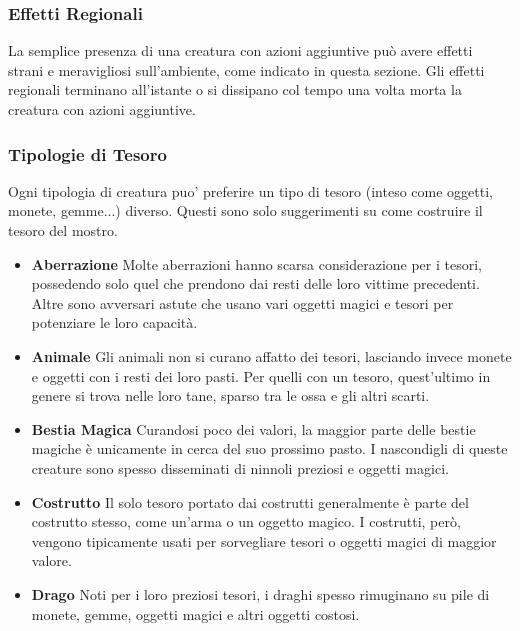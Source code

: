 \begin{multicols}{2}
\subsubsection{Effetti Regionali}

La semplice presenza di una creatura con azioni aggiuntive può  avere effetti strani e meravigliosi sull'ambiente, come  indicato in questa sezione. Gli effetti regionali terminano all'istante o si dissipano col tempo una volta  morta la creatura con azioni aggiuntive.


\subsubsection{Tipologie di Tesoro}

Ogni tipologia di creatura puo' preferire un tipo di tesoro (inteso come oggetti, monete, gemme...) diverso. Questi sono solo suggerimenti su come costruire il tesoro del mostro.

\medskip

\begin{itemize}

\item \textbf{Aberrazione}
Molte aberrazioni hanno scarsa considerazione per i tesori, possedendo solo quel che prendono dai resti delle loro vittime precedenti. Altre sono avversari astute che usano vari oggetti magici e tesori per potenziare le loro capacità.

\item \textbf{Animale}
Gli animali non si curano affatto dei tesori, lasciando invece monete e oggetti con i resti dei loro pasti. Per quelli con un tesoro, quest'ultimo in genere si trova nelle loro tane, sparso tra le ossa e gli altri scarti.

\item \textbf{Bestia Magica}
Curandosi poco dei valori, la maggior parte delle bestie magiche è unicamente in cerca del suo prossimo pasto. I nascondigli di queste creature sono spesso disseminati di ninnoli preziosi e oggetti magici.

\item \textbf{Costrutto}
Il solo tesoro portato dai costrutti generalmente è parte del costrutto stesso, come un'arma o un oggetto magico. I costrutti, però, vengono tipicamente usati per sorvegliare tesori o oggetti magici di maggior valore.

\item \textbf{Drago}
Noti per i loro preziosi tesori, i draghi spesso rimuginano su pile di monete, gemme, oggetti magici e altri oggetti costosi.


\end{itemize}
\end{multicols}
